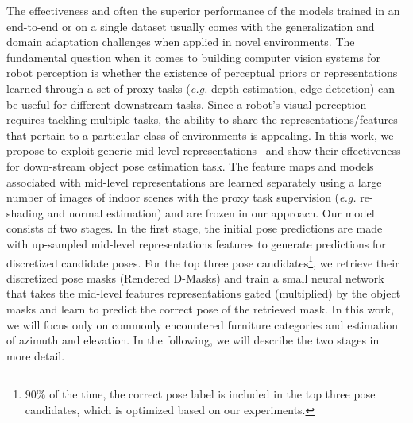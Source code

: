 \documentclass[letterpaper, 10 pt, conference]{ieeeconf}  \pdfoutput=1
\begin{document}
The effectiveness and often the superior performance of the models trained in an end-to-end or on a single dataset usually comes with the generalization and domain adaptation challenges when applied in novel environments.
The fundamental question when it comes to building computer vision systems for robot perception is whether the existence of perceptual priors or representations learned through a set of proxy tasks ({\em e.g.} depth estimation, edge detection) can be useful for different downstream tasks.  Since a robot's visual perception requires tackling multiple tasks, the ability to share the representations/features that pertain to a particular class of environments is appealing. In this work, we propose to exploit generic mid-level representations~\cite{taskonomy2018} and show their effectiveness for down-stream object pose estimation task. 
The feature maps and models associated with mid-level representations are learned separately using a large number of images of indoor scenes with the proxy task supervision ({\em e.g.} re-shading and normal estimation) and are frozen in our approach.\newline
Our model consists of two stages. In the first stage, the initial pose predictions are made with up-sampled mid-level representations features to generate predictions for discretized candidate poses. For the top three pose candidates\footnote{$90\%$ of the time, the correct pose label is included in the top three pose candidates, which is optimized based on our experiments.}, we retrieve their discretized pose masks (Rendered D-Masks) and train a small neural network that takes the mid-level features representations gated (multiplied) by the object masks and learn to predict the correct pose of the retrieved mask. In this work, we will focus only on commonly encountered furniture categories and estimation of azimuth and elevation.
In the following, we will describe the two stages in more detail. 
\end{document}
